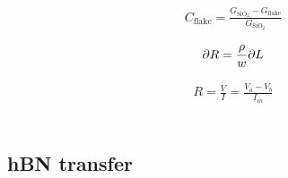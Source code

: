 \documentclass[../Matt_Gebert_Honours_Thesis.tex]{subfiles}
\begin{document}
\begin{align}
	C_{\text{flake}} = \frac{G_{\text{SiO}_2}-G_{\text{flake}}}{G_{\text{SiO}_2}}
\end{align}

\begin{align}
	\partial R = \frac{\rho}{w} \partial L
\end{align}

\begin{align}
	R = \frac{V}{I} = \frac{V_a-V_b}{I_{in}}
\end{align}




\begin{align}
\end{align}

\subsection{hBN transfer}
\end{document}
